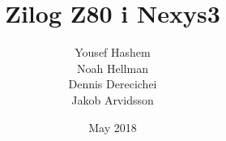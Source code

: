 \usepackage[utf8]{inputenc}
\usepackage[swedish]{babel}

\usepackage[backend=bibtex8]{biblatex}


\usepackage{graphicx}

\title{\Huge Zilog Z80 i Nexys3}
\author{\LARGE Yousef Hashem\\
        \LARGE Noah Hellman\\
        \LARGE Dennis Derecichei\\ 
        \LARGE Jakob Arvidsson}
\date{\Large May 2018}

